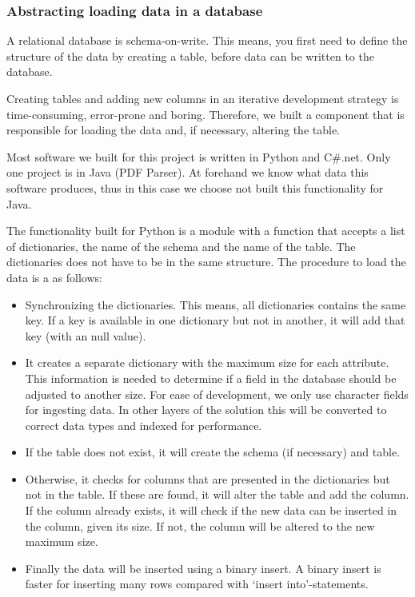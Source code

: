 \documentclass{ou-report}
\begin{document}
\subsubsection{Abstracting loading data in a database}
\label{gen_impl:abstract_database}
A relational database is schema-on-write. This means, you first need to define 
the structure of the data by creating a table, before data can be written to the 
database.

Creating tables and adding new columns in an iterative development strategy is
time-consuming, error-prone and boring. Therefore, we built a component that is 
responsible for loading the data and, if necessary, altering the table.

Most software we built for this project is written in Python and C\#.net. Only
one project is in Java (PDF Parser). At forehand we know what data this software
produces, thus in this case we choose not built this functionality for Java.

The functionality built for Python is a module with a function that accepts a 
list of dictionaries, the name of the schema and the name of the table. The 
dictionaries does not have to be in the same 
structure. The procedure to load the data is a as follows:
\begin{itemize}
    \item Synchronizing the dictionaries. This means, all dictionaries contains
    the same key. If a key is available in one dictionary but not in another, it
    will add that key (with an null value).
    \item It creates a separate dictionary with the maximum size for each 
    attribute. This
    information is needed to determine if a field in the database should be 
    adjusted to another size. For ease of development, we only use character 
    fields for ingesting data. In other layers of the solution this will be 
    converted to correct data types and indexed for performance.
    \item If the table does not exist, it will create the schema (if necessary) 
    and table.
    \item Otherwise, it checks for columns that are presented in the 
    dictionaries but not in the table. If these are found, it will alter the 
    table and add the column. If the column already exists, it will check if the
    new data can be inserted in the column, given its size. If not, the column will 
    be altered to the new maximum size.
    \item Finally the data will be inserted using a binary insert. A binary 
    insert is faster for inserting many rows compared with 
    `insert into'-statements.
\end{itemize}
\end{document}
